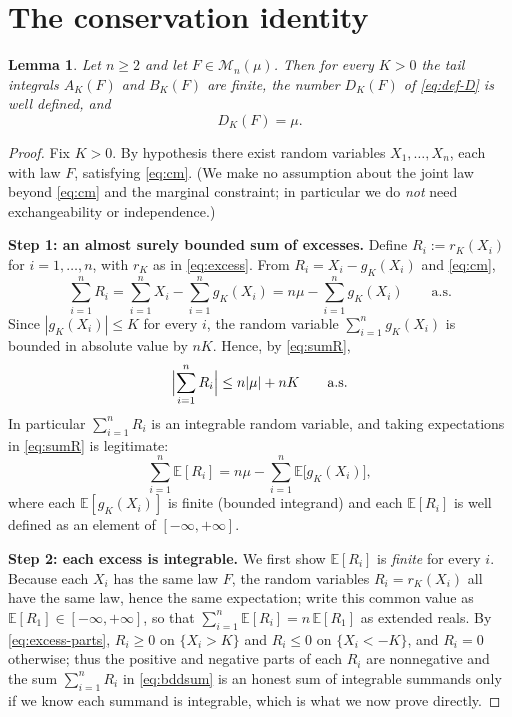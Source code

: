 \documentclass{amsart}
\newtheorem{lemma}{Lemma}
\theoremstyle{definition}
\theoremstyle{remark}
\begin{document}
\section{The conservation identity}

\begin{lemma}\label{lem:key}
Let $n\ge 2$ and let $F\in\mathcal{M}_n(\mu)$. Then for every $K>0$ the tail integrals
$A_K(F)$ and $B_K(F)$ are finite, the number $D_K(F)$ of \eqref{eq:def-D} is well defined,
and
\begin{equation}\label{eq:conservation}
D_K(F)=\mu .
\end{equation}
\end{lemma}

\begin{proof}
Fix $K>0$. By hypothesis there exist random variables $X_1,\dots,X_n$, each with law $F$,
satisfying \eqref{eq:cm}. (We make no assumption about the joint law beyond \eqref{eq:cm}
and the marginal constraint; in particular we do \emph{not} need exchangeability or
independence.)

\smallskip\noindent\textbf{Step 1: an almost surely bounded sum of excesses.}
Define $R_i:=r_K(X_i)$ for $i=1,\dots,n$, with $r_K$ as in \eqref{eq:excess}. From
$R_i=X_i-g_K(X_i)$ and \eqref{eq:cm},
\begin{equation}\label{eq:sumR}
\sum_{i=1}^{n}R_i=\sum_{i=1}^{n}X_i-\sum_{i=1}^{n}g_K(X_i)
= n\mu-\sum_{i=1}^{n}g_K(X_i)\qquad\text{a.s.}
\end{equation}
Since $|g_K(X_i)|\le K$ for every $i$, the random variable
$\sum_{i=1}^n g_K(X_i)$ is bounded in absolute value by $nK$. Hence, by \eqref{eq:sumR},
\begin{equation}\label{eq:bddsum}
\Bigl|\sum_{i=1}^{n}R_i\Bigr|\le n|\mu|+nK\qquad\text{a.s.}
\end{equation}
In particular $\sum_{i=1}^n R_i$ is an integrable random variable, and taking expectations
in \eqref{eq:sumR} is legitimate:
\begin{equation}\label{eq:Etaken}
\sum_{i=1}^{n}\mathbb{E}[R_i]=n\mu-\sum_{i=1}^{n}\mathbb{E}\bigl[g_K(X_i)\bigr],
\end{equation}
where each $\mathbb{E}[g_K(X_i)]$ is finite (bounded integrand) and each $\mathbb{E}[R_i]$
is well defined as an element of $[-\infty,+\infty]$.

\smallskip\noindent\textbf{Step 2: each excess is integrable.}
We first show $\mathbb{E}[R_i]$ is \emph{finite} for every $i$. Because each $X_i$ has the
same law $F$, the random variables $R_i=r_K(X_i)$ all have the same law, hence the same
expectation; write this common value as $\mathbb{E}[R_1]\in[-\infty,+\infty]$, so that
$\sum_{i=1}^n\mathbb{E}[R_i]=n\,\mathbb{E}[R_1]$ as extended reals. By \eqref{eq:excess-parts},
$R_i\ge 0$ on $\{X_i>K\}$ and $R_i\le 0$ on $\{X_i<-K\}$, and $R_i=0$ otherwise; thus the
positive and negative parts of each $R_i$ are nonnegative and the sum
$\sum_{i=1}^n R_i$ in \eqref{eq:bddsum} is an honest sum of integrable summands only if we
know each summand is integrable, which is what we now prove directly.


\end{proof}
\end{document}
